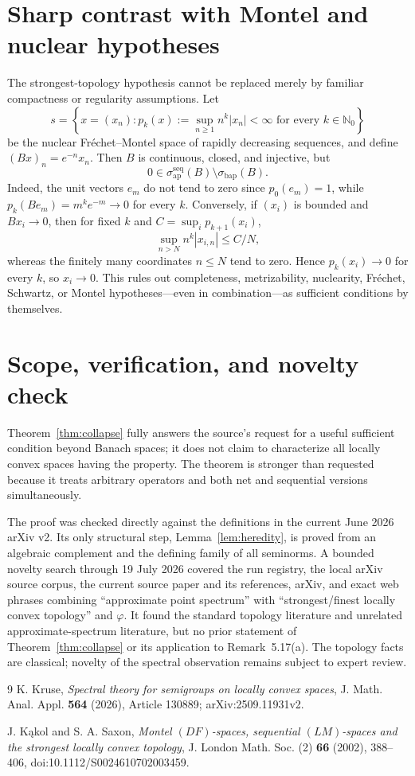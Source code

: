 \documentclass[11pt]{article}
\newcommand{\N}{\mathbb N}
\newcommand{\sbap}{\sigma_{\mathrm{bap}}}
\newcommand{\saseq}{\sigma_{\mathrm{ap}}^{\mathrm{seq}}}
\begin{document}
\section{Sharp contrast with Montel and nuclear hypotheses}

The strongest-topology hypothesis cannot be replaced merely by familiar
compactness or regularity assumptions.  Let
\[
 s=\left\{x=(x_n):p_k(x):=\sup_{n\ge1}n^k|x_n|<\infty
       \text{ for every }k\in\N_0\right\}
\]
be the nuclear Fr\'echet--Montel space of rapidly decreasing sequences, and
define $(Bx)_n=e^{-n}x_n$.  Then $B$ is continuous, closed, and injective, but
\[
 0\in\saseq(B)\setminus\sbap(B).
\]
Indeed, the unit vectors $e_m$ do not tend to zero since $p_0(e_m)=1$, while
$p_k(Be_m)=m^ke^{-m}\to0$ for every $k$.  Conversely, if $(x_i)$ is bounded
and $Bx_i\to0$, then for fixed $k$ and
$C=\sup_i p_{k+1}(x_i)$,
\[
 \sup_{n>N}n^k|x_{i,n}|\le C/N,
\]
whereas the finitely many coordinates $n\le N$ tend to zero.  Hence
$p_k(x_i)\to0$ for every $k$, so $x_i\to0$.  This rules out completeness,
metrizability, nuclearity, Fr\'echet, Schwartz, or Montel hypotheses---even in
combination---as sufficient conditions by themselves.

\section{Scope, verification, and novelty check}

Theorem~\ref{thm:collapse} fully answers the source's request for a useful
sufficient condition beyond Banach spaces; it does not claim to characterize
all locally convex spaces having the property.  The theorem is stronger than
requested because it treats arbitrary operators and both net and sequential
versions simultaneously.

The proof was checked directly against the definitions in the current June
2026 arXiv v2.  Its only structural step, Lemma~\ref{lem:heredity}, is proved
from an algebraic complement and the defining family of all seminorms.  A
bounded novelty search through 19 July 2026 covered the run registry, the
local arXiv source corpus, the current source paper and its references, arXiv,
and exact web phrases combining ``approximate point spectrum'' with
``strongest/finest locally convex topology'' and $\varphi$.  It found the
standard topology literature and unrelated approximate-spectrum literature,
but no prior statement of Theorem~\ref{thm:collapse} or its application to
Remark~5.17(a).  The topology facts are classical; novelty of the spectral
observation remains subject to expert review.

\begin{thebibliography}{9}
K. Kruse, \emph{Spectral theory for semigroups on locally convex spaces},
J. Math. Anal. Appl. \textbf{564} (2026), Article 130889;
arXiv:2509.11931v2.

J. K\k{a}kol and S. A. Saxon,
\emph{Montel $(DF)$-spaces, sequential $(LM)$-spaces and the strongest locally
convex topology}, J. London Math. Soc. (2) \textbf{66} (2002), 388--406,
doi:10.1112/S0024610702003459.
\end{thebibliography}
\end{document}
